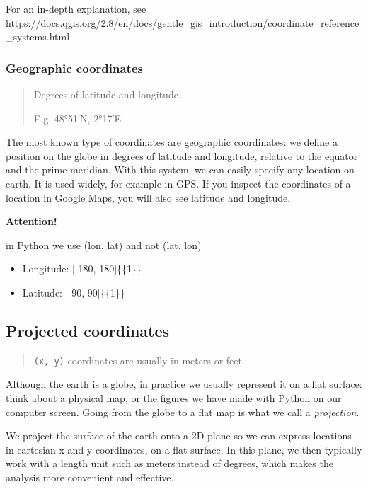 \documentclass[
  letterpaper,
  DIV=11,
  numbers=noendperiod]{scrreprt}
\providecommand{\tightlist}{%
  \setlength{\itemsep}{0pt}\setlength{\parskip}{0pt}}\usepackage{longtable,booktabs,array}
\begin{document}
For an in-depth explanation, see
https://docs.qgis.org/2.8/en/docs/gentle\_gis\_introduction/coordinate\_reference\_systems.html

\hypertarget{geographic-coordinates}{%
\subsubsection{Geographic coordinates}\label{geographic-coordinates}}

\begin{quote}
Degrees of latitude and longitude.

E.g. 48°51′N, 2°17′E
\end{quote}

The most known type of coordinates are geographic coordinates: we define
a position on the globe in degrees of latitude and longitude, relative
to the equator and the prime meridian. With this system, we can easily
specify any location on earth. It is used widely, for example in GPS. If
you inspect the coordinates of a location in Google Maps, you will also
see latitude and longitude.

\textbf{Attention!}

in Python we use (lon, lat) and not (lat, lon)

\begin{itemize}
\tightlist
\item
  Longitude: {[}-180, 180{]}\{\{1\}\}
\item
  Latitude: {[}-90, 90{]}\{\{1\}\}
\end{itemize}

\hypertarget{projected-coordinates}{%
\subsection{Projected coordinates}\label{projected-coordinates}}

\begin{quote}
\texttt{(x,\ y)} coordinates are usually in meters or feet
\end{quote}

Although the earth is a globe, in practice we usually represent it on a
flat surface: think about a physical map, or the figures we have made
with Python on our computer screen. Going from the globe to a flat map
is what we call a \emph{projection}.

We project the surface of the earth onto a 2D plane so we can express
locations in cartesian x and y coordinates, on a flat surface. In this
plane, we then typically work with a length unit such as meters instead
of degrees, which makes the analysis more convenient and effective.
\end{document}
